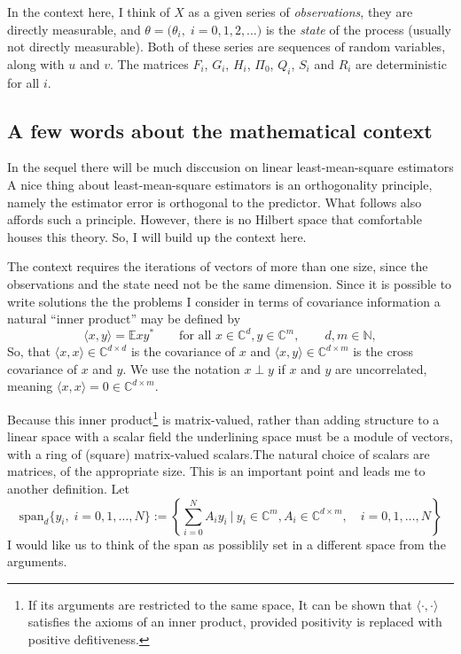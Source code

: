 \documentclass[12pt]{amsart}
\newcommand{\E}{\mathbb{E}}
\newcommand{\C}{\mathbb{C}}
\newcommand{\N}{\mathbb{N}}
\begin{document}
In the context here, I think of $X$ as a given series of\textit{ observations}, they are directly measurable, and $\theta = \big(\theta_i,\; i = 0,1,2,\dots\big)$ is the \textit{state} of the process (usually not directly measurable). Both of these series are sequences of random variables, along with $u$ and $v$. The matrices $F_i$, $G_i$, $H_i$, $\Pi_0$, $Q_i$, $S_i$ and $R_i$ are deterministic for all $i$. 

\subsection{A few words about the mathematical context}
In the sequel there will be much disccusion on  linear least-mean-square estimators
A nice thing about least-mean-square estimators is an orthogonality principle, namely the estimator error is orthogonal to the predictor. What follows also affords such a principle. However, there is no Hilbert space that comfortable houses this theory. So, I will build up the context here. 

The context requires the iterations of vectors of more than one size, since the observations and the state need not be the same dimension. Since it is possible to write solutions the the problems I consider in terms of covariance information a natural ``inner product'' may be defined by
\begin{equation}
\langle x,y \rangle = \E xy^*\qquad \text{for all }x\in \C^d,y\in \C^m, \qquad d,m \in \N,
\label{def: inner p}
\end{equation}
So, that $\langle x,x \rangle \in \C^{d\times d}$ is the covariance of $x$ and $\langle x,y \rangle \in \C^{d\times m}$ is the cross covariance of $x$ and $y$. We use the notation $x \perp y$ if $x$ and $y$ are uncorrelated, meaning $\langle x,x \rangle = 0 \in \C^{d\times m}$.  

Because this inner product\footnote{
	If its arguments are restricted to the same space, It can be shown that $\langle \cdot, \cdot\rangle$ satisfies the axioms of an inner product, provided positivity is replaced with positive defitiveness.}
is matrix-valued, rather than adding structure to a linear space with a scalar field the underlining space must be a module of vectors, with a ring of (square) matrix-valued scalars.The natural choice of scalars are matrices, of the appropriate size. This is an important point and leads me to another definition.
Let $$\text{span}_d\{y_i,\;i=0,1,\dots,N\} := \left\{\sum_{i=0}^N A_iy_i ~\bigg|~ y_i\in \C^m,A_i \in \C^{d\times m},\quad i=0,1,\dots,N\right\}$$
I would like us to think of the span as possiblily set in a different space from the arguments.
\end{document}
